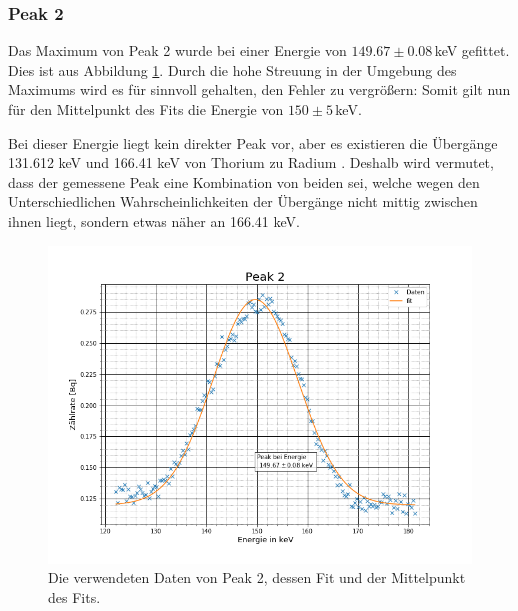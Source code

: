\subsubsection{Peak 2}
Das Maximum von Peak 2 wurde bei einer Energie von $149.67\pm0.08\,$keV gefittet. Dies ist aus Abbildung \ref{p2}. Durch die hohe Streuung in der Umgebung des Maximums wird es für sinnvoll gehalten, den Fehler zu vergrößern: Somit gilt nun für den Mittelpunkt des Fits die Energie von $150\pm5\,$keV.\par
Bei dieser Energie liegt kein direkter Peak vor, aber es existieren die Übergänge 131.612 keV  und 166.41 keV  von Thorium zu Radium \cite{Thorium} . Deshalb wird vermutet, dass der gemessene Peak eine Kombination von beiden sei, welche wegen den Unterschiedlichen Wahrscheinlichkeiten der Übergänge nicht mittig zwischen ihnen liegt, sondern etwas näher an 166.41 keV.
\begin{figure}[h]
	\centering
	\includegraphics[scale=0.7]{Bilder/Anhang/P2}
	\caption[Thorium Peak 2]{\small Die verwendeten Daten von Peak 2, dessen Fit und der Mittelpunkt des Fits.}
	\label{p2}
\end{figure}

